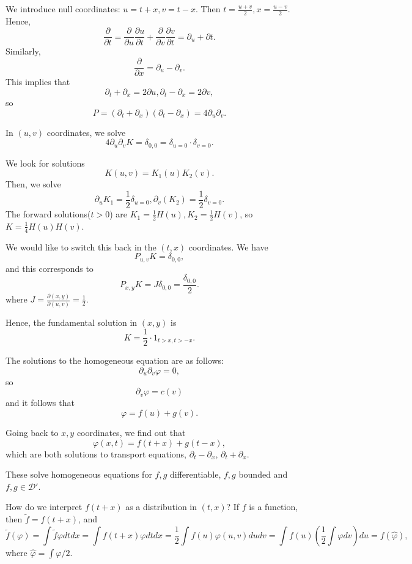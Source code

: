 \documentclass[12pt]{scrartcl}
\renewcommand{\hat}{\widehat}
\let \phi \varphi
\begin{document}
We introduce null coordinates: $u = t+x, v = t-x$.  Then $t = \frac{u+v}{2}, x = \frac{u-v}{2}.$  Hence,
$$\frac{\partial}{\partial t} = \frac{\partial}{\partial u} \frac{\partial u}{\partial t} + \frac{\partial}{\partial v}\frac{\partial v}{\partial t} = \partial_u + \partial t.$$
Similarly,
$$\frac{\partial}{\partial x} = \partial_u - \partial_v.$$
This implies that 
$$\partial_t + \partial_x = 2 \partial u, \partial_t - \partial_x = 2\partial v,$$
so $$P = (\partial_t + \partial_x)(\partial_t - \partial_x) = 4 \partial_u \partial_v.$$


In $(u, v)$ coordinates, we solve 
$$4 \partial_u\partial_v K = \delta_{0, 0} = \delta_{u = 0} \cdot \delta_{v = 0}.$$

We look for solutions 
$$K(u, v) = K_1(u) K_2(v).$$
Then, we solve 
$$\partial_u K_1 = \frac{1}{2} \delta_{u = 0}, \partial_v(K_2) = \frac{1}{2}\delta_{v = 0}.$$
The forward solutions($t > 0$) are $K_1 = \frac{1}{2}H(u), K_2 = \frac{1}{2}H(v)$, so $K = \frac{1}{4}H(u)H(v).$

We would like to switch this back in the $(t, x)$ coordinates.
We have $$P_{u, v} K = \delta_{0, 0},$$
and this corresponds to $$P_{x, y} K = J \delta_{0, 0} = \frac{\delta_{0, 0}}{2}.$$
where $J = \frac{\partial(x, y)}{\partial(u, v)} = \frac{1}{2}.$

Hence, the fundamental solution in $(x, y)$ is $$K = \frac{1}{2}\cdot 1_{t > x, t > -x}.$$

The solutions to the homogeneous equation are as follows: 
$$\partial_u \partial_v \phi = 0,$$
so $$\partial_v \phi = c(v)$$
and it follows that $$\phi = f(u) + g(v).$$

Going back to $x, y$ coordinates, we find out that $$\phi(x, t) = f(t + x) + g(t-x),$$
which are both solutions to transport equations, $\partial_t - \partial_x$, $\partial_t+ \partial_x$.

These solve homogeneous equations for $f, g$ differentiable, $f, g$ bounded and $f, g \in\mathcal D'$.  

How do we interpret $f(t+x)$ as a distribution in $(t, x)$?  If $f$ is a function, then 
$\tilde{f} = f(t+x)$, and 
$$\tilde f(\phi) = \int \tilde{f} \phi dtdx = \int f(t+x) \phi dtdx = \frac{1}{2}\int f(u)\phi(u, v)dudv = \int f(u) \left(\frac{1}{2}\int \phi dv\right)du = f(\hat \phi),$$
where $\hat \phi = \int \phi/2$.
\end{document}
